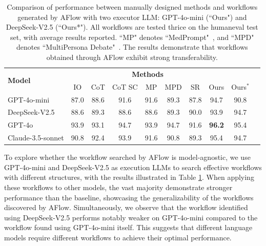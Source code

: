 \documentclass{article} %
\newcommand{\model}{{\sc AFlow}\xspace}
\theoremstyle{plain}
\theoremstyle{definition}
\theoremstyle{remark}
\begin{document}
\begin{table}[!htbp]
\caption{Comparison of performance between manually designed methods and workflows generated by \model with two executor LLM: GPT-4o-mini (``Ours") and DeepSeek-V2.5 (``Ours*"). All workflows are tested thrice on the humaneval test set, with average results reported. ``MP" denotes ``MedPrompt"~\citep{nori2023medprompt}, and ``MPD" denotes ``MultiPersona Debate"~\citep{wang2023multipersona}. The results demonstrate that workflows obtained through \model exhibit strong transferability.}
\scriptsize
\renewcommand\tabcolsep{5.0pt}
\renewcommand\arraystretch{1.2}
\small
\setlength{\abovecaptionskip}{0.1cm}
\setlength{\belowcaptionskip}{-0.2cm}
\centering
\begin{tabular}{l|ccccccccc}
\hline

\hline

\hline

\hline
\multirow{2}{*}{\textbf{Model}} & \multicolumn{7}{c}{\textbf{Methods}}\\
& IO & CoT & CoT SC & MP & MPD &  SR & Ours & Ours$^{*}$ \\
\hline
GPT-4o-mini & 87.0 & 88.6 & 91.6 & 91.6 & 89.3 & 87.8 & 94.7 & 90.8 \\
DeepSeek-V2.5 & 88.6 & 89.3 & 88.6 & 88.6 & 89.3 & 90.0 & 93.9 & 94.7 \\
GPT-4o & 93.9 & 93.1 & 94.7 & 93.9 & 94.7& 91.6 & \textbf{96.2} & 95.4 \\
Claude-3.5-sonnet & 90.8 & 92.4 & 93.9 & 91.6 & 90.8 & 89.3 & 95.4 & 94.7 \\
\hline

\hline

\hline

\hline
\end{tabular}
\label{tab:humaneval}
\end{table}

To explore whether the workflow searched by \model is model-agnostic, we use GPT-4o-mini and DeepSeek-V2.5 as execution LLMs to search effective workflows with different structures, with the results illustrated in Table \ref{tab:humaneval}. When applying these workflows to other models, the vast majority demonstrate stronger performance than the baseline, showcasing the generalizability of the workflows discovered by \model. Simultaneously, we observe that the workflow identified using DeepSeek-V2.5 performs notably weaker on GPT-4o-mini compared to the workflow found using GPT-4o-mini itself. This suggests that different language models require different workflows to achieve their optimal performance.
\end{document}
